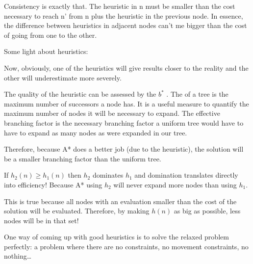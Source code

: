 Consistency is exactly that. The heuristic in n must be smaller than the cost necessary to reach n' from n plus the heuristic in the previous node. In essence, the difference between heuristics in adjacent nodes can't me bigger than the cost of going from one to the other.



Some light about heuristics:




Now, obviously, one of the heuristics will give results closer to the reality and the 
other will underestimate more severely. 

The quality of the heuristic can be assessed by the  $b^*$ .
The  of a tree is the maximum number of successors a node has. It is a useful measure to quantify the maximum number of nodes it will be necessary to expand. The effective branching factor is the necessary branching factor a uniform tree would have to have to expand as many nodes as were expanded in our tree.

Therefore, because A* does a better job (due to the heuristic), the solution will be a smaller branching factor than the uniform tree. 



If $h_2(n) \geq h_1(n)$ then $h_2$ dominates $h_1$ and domination translates directly into efficiency! Because A* using $h_2$ will never expand more nodes than using $h_1$.


This is true because all nodes with an evaluation smaller than the cost of the solution will be evaluated. Therefore, by making $h(n)$ as big as possible, less nodes will be in that set!


\begin{center}
\end{center}




One way of coming up with good heuristics is to solve the relaxed problem perfectly:
a problem where there are no constraints, no movement constraints, no nothing\dots

